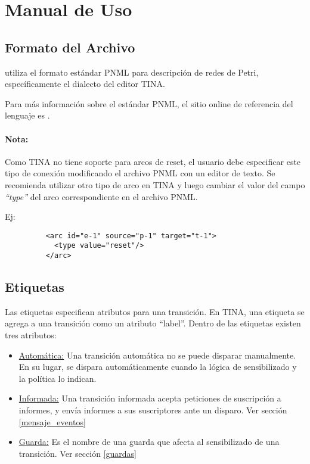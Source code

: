 \section{Manual de Uso}

\subsection{Formato del Archivo}

\javapetriconcurrencymonitor utiliza el formato estándar PNML para descripción
de redes de Petri, específicamente el dialecto del editor TINA\cite{TinaSite}.

Para más información sobre el estándar PNML, el sitio online de referencia del
lenguaje es \cite{PnmlSite}.

\begin{framed}
    \paragraph{Nota:}
    Como TINA no tiene soporte para arcos de reset, el usuario debe especificar
    este tipo de conexión modificando el archivo PNML con un editor de texto.
    Se recomienda utilizar otro tipo de arco en TINA y luego cambiar el valor del
    campo \textit{``type''} del arco correspondiente en el archivo PNML.
    
    Ej:
    \begin{figure}[H]
    \centering
    \begin{verbatim}
    <arc id="e-1" source="p-1" target="t-1">
      <type value="reset"/>
    </arc>
    \end{verbatim}
    \end{figure}
\end{framed}

\subsection{Etiquetas}

Las etiquetas especifican atributos para una transición. En TINA, una etiqueta
se agrega a una transición como un atributo ``label''.
Dentro de las etiquetas existen tres atributos:

\begin{itemize}
    \item \underline{Automática:} Una transición automática no se puede disparar
    manualmente. En su lugar, se dispara automáticamente cuando la lógica de
    sensibilizado y la política lo indican.
    \item \underline{Informada:} Una transición informada acepta peticiones de
    suscripción a informes, y envía informes a sus suscriptores ante un disparo.
    Ver sección \ref{mensaje_eventos}
    \item \underline{Guarda:} Es el nombre de una guarda que afecta
    al sensibilizado de una transición. Ver sección \ref{guardas}
\end{itemize}

